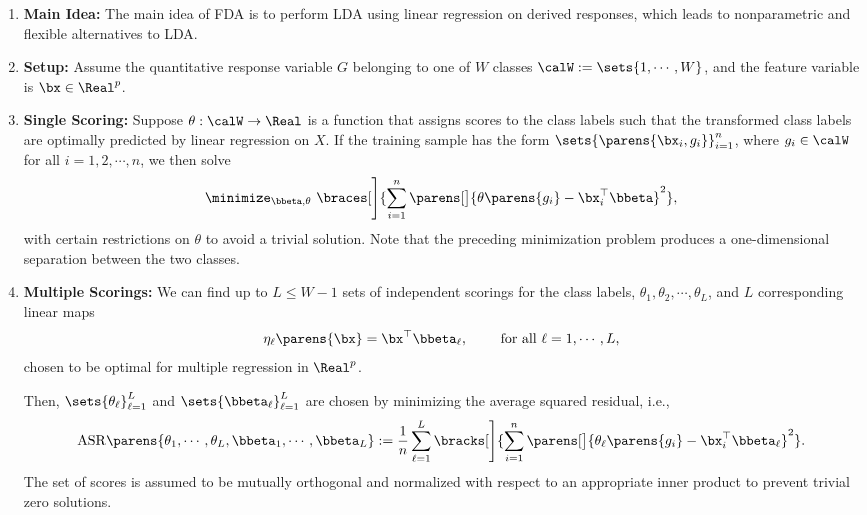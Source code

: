 \documentclass[12pt]{article}
\begin{document}
\begin{enumerate}[label=\textbf{\arabic*.}]

	\item \textbf{Main Idea:} The main idea of FDA is to perform LDA using linear regression on derived responses, which leads to nonparametric and flexible alternatives to LDA. 
	
	\item \textbf{Setup:} Assume the quantitative response variable $G$ belonging to one of $W$ classes $\calW := \sets{1, \cdots, W}$, and the feature variable is $\bx \in \Real^p$. 
	
	\item \textbf{Single Scoring:} Suppose $\theta: \calW \to \Real$ is a function that assigns scores to the class labels such that the transformed class labels are optimally predicted by linear regression on $X$. If the training sample has the form $\sets{\parens{\bx_i, g_i}}_{i=1}^n$, where $g_i \in \calW$ for all $i = 1, 2, \cdots, n$, we then solve 
	\begin{align*}
		\minimize_{\bbeta, \theta} \ \braces[\Bigg]{ \sum_{i=1}^n \parens[\big]{\theta \parens{g_i} - \bx_i^\top \bbeta}^2}, 
	\end{align*}
	with certain restrictions on $\theta$ to avoid a trivial solution. Note that the preceding minimization problem produces a one-dimensional separation between the two classes. 
	
	\item \textbf{Multiple Scorings:} We can find up to $L \le W - 1$ sets of independent scorings for the class labels, $\theta_1, \theta_2, \cdots, \theta_L$, and $L$ corresponding linear maps 
	\begin{align*}
		\eta_\ell \parens{\bx} = \bx^\top \bbeta_\ell, \qquad \text{ for all } \ell = 1, \cdots, L, 
	\end{align*}
	chosen to be optimal for multiple regression in $\Real^p$. 
	
	Then, $\sets{\theta_\ell}_{\ell = 1}^L$ and $\sets{\bbeta_\ell}_{\ell=1}^L$ are chosen by minimizing the average squared residual, i.e., 
	\begin{align*}
		\mathrm{ASR} \parens{\theta_1, \cdots, \theta_L, \bbeta_1, \cdots, \bbeta_L} := \frac{1}{n} \sum_{\ell=1}^L \bracks[\Bigg]{\sum_{i=1}^n \parens[\big]{\theta_{\ell} \parens{g_i} - \bx_i^\top \bbeta_{\ell}}^2}. 
	\end{align*}
	The set of scores is assumed to be mutually orthogonal and normalized with respect to an appropriate inner product to prevent trivial zero solutions. 
	

\end{enumerate}
\end{document}
